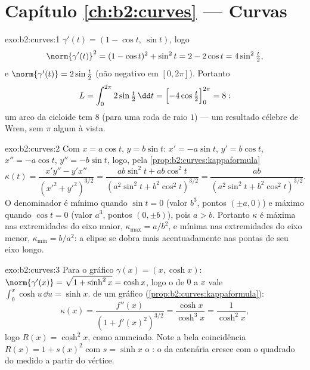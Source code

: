 \section*{Capítulo \ref{ch:b2:curves} --- Curvas}

\begin{solution}{exo:b2:curves:1}
$\gamma'(t) = (1 - \cos t,\ \sin t)$, logo
\[
\norm{\gamma'(t)}^2 = (1 - \cos t)^2 + \sin^2 t
= 2 - 2\cos t = 4\sin^2\tfrac t2 ,
\]
e $\norm{\gamma'(t)} = 2\sin\frac t2$ (não negativo em $[0,
2\pi]$). Portanto
\[
L = \int_0^{2\pi} 2\sin\tfrac t2\,\dd t
= \Bigl[-4\cos\tfrac t2\Bigr]_0^{2\pi} = 8 :
\]
um arco da cicloide tem  $8$ (para uma roda de raio
$1$) --- um resultado célebre de Wren, sem $\pi$ algum à vista.
\end{solution}

\begin{solution}{exo:b2:curves:2}
Com $x = a\cos t$, $y = b\sin t$: $x' = -a\sin t$, $y' = b\cos
t$, $x'' = -a\cos t$, $y'' = -b\sin t$, logo, pela
\cref{prop:b2:curves:kappaformula}
\[
\kappa(t)
= \frac{x'y'' - y'x''}{(x'^2 + y'^2)^{3/2}}
= \frac{ab\sin^2 t + ab\cos^2 t}
       {(a^2\sin^2 t + b^2\cos^2 t)^{3/2}}
= \frac{ab}{(a^2\sin^2 t + b^2\cos^2 t)^{3/2}} .
\]
O denominador é mínimo quando $\sin t = 0$ (valor $b^3$, pontos
$(\pm a, 0)$) e máximo quando $\cos t = 0$ (valor $a^3$, pontos
$(0, \pm b)$), pois $a > b$. Portanto $\kappa$ é máxima nas
extremidades do eixo maior, $\kappa_{\max} = a/b^2$, e mínima nas
extremidades do eixo menor, $\kappa_{\min} = b/a^2$: a elipse
se dobra mais acentuadamente nas pontas de seu eixo longo.
\end{solution}

\begin{solution}{exo:b2:curves:3}
Para o gráfico $\gamma(x) = (x, \cosh x)$: $\norm{\gamma'(x)} =
\sqrt{1 + \sinh^2 x} = \cosh x$, logo o  de $0$ a $x$
vale $\int_0^x \cosh u\,\dd u = \sinh x$.  de um gráfico
(\cref{prop:b2:curves:kappaformula}):
\[
\kappa(x) = \frac{f''(x)}{(1 + f'(x)^2)^{3/2}}
= \frac{\cosh x}{\cosh^3 x} = \frac{1}{\cosh^2 x} ,
\]
logo $R(x) = \cosh^2 x$, como anunciado. Note a bela coincidência
$R(x) = 1 + s(x)^2$ com $s = \sinh x$ o : o
 da catenária cresce com o quadrado do  medido a partir do vértice.
\end{solution}


